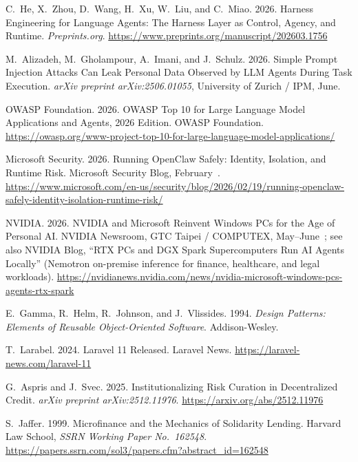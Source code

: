 \documentclass[12pt,a4paper]{report}
\begin{document}
{\begin{enumerate}[label={[\arabic*]}]
\item C.~He, X.~Zhou, D.~Wang, H.~Xu, W.~Liu, and C.~Miao. 2026. Harness Engineering for Language Agents: The Harness Layer as Control, Agency, and Runtime. \emph{Preprints.org}. \url{https://www.preprints.org/manuscript/202603.1756}

\item M.~Alizadeh, M.~Gholampour, A.~Imani, and J.~Schulz. 2026. Simple Prompt Injection Attacks Can Leak Personal Data Observed by LLM Agents During Task Execution. \emph{arXiv preprint arXiv:2506.01055}, University of Zurich / IPM, June.

\item OWASP Foundation. 2026. OWASP Top 10 for Large Language Model Applications and Agents, 2026 Edition. OWASP Foundation. \url{https://owasp.org/www-project-top-10-for-large-language-model-applications/}

\item Microsoft Security. 2026. Running OpenClaw Safely: Identity, Isolation, and Runtime Risk. Microsoft Security Blog, February~. \url{https://www.microsoft.com/en-us/security/blog/2026/02/19/running-openclaw-safely-identity-isolation-runtime-risk/}

\item NVIDIA. 2026. NVIDIA and Microsoft Reinvent Windows PCs for the Age of Personal AI. NVIDIA Newsroom, GTC Taipei / COMPUTEX, May--June~; see also NVIDIA Blog, ``RTX PCs and DGX Spark Supercomputers Run AI Agents Locally'' (Nemotron on-premise inference for finance, healthcare, and legal workloads). \url{https://nvidianews.nvidia.com/news/nvidia-microsoft-windows-pcs-agents-rtx-spark}

\item E.~Gamma, R.~Helm, R.~Johnson, and J.~Vlissides. 1994. \emph{Design Patterns: Elements of Reusable Object-Oriented Software}. Addison-Wesley.

\item T.~Larabel. 2024. Laravel 11 Released. Laravel News. \url{https://laravel-news.com/laravel-11}

\item G.~Aspris and J.~Svec. 2025. Institutionalizing Risk Curation in Decentralized Credit. \emph{arXiv preprint arXiv:2512.11976}. \url{https://arxiv.org/abs/2512.11976}

\item S.~Jaffer. 1999. Microfinance and the Mechanics of Solidarity Lending. Harvard Law School, \emph{SSRN Working Paper No.~162548}. \url{https://papers.ssrn.com/sol3/papers.cfm?abstract_id=162548}


\end{enumerate}}
\end{document}

